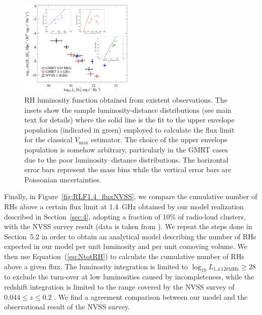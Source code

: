 \documentclass[traditabstract]{aa}
\newcommand{\rmn}{\mathrm}
\begin{document}
\begin{appendix}
\begin{figure}[t]
\centering
\includegraphics[width=0.48\textwidth]{figures/RLF_observations.eps}
\caption{RH luminosity function obtained from existent observations. The insets show the sample luminosity-distance distributions (see main text for details) where the solid line is the fit to the upper envelope population (indicated in green) employed to calculate the flux limit for the classical $V_{\rmn{max}}$ estimator. The choice of the upper envelope population is somehow arbitrary, particularly in the GMRT cases due to the poor luminosity--distance distributions. The horizontal error bars represent the mass bins while the vertical error bars are Poissonian uncertainties.}
\label{fig:RLFobs}
\end{figure}

Finally, in Figure~\ref{fig:RLF1.4_fluxNVSS}, we compare the cumulative number of RHs above a certain flux limit at 1.4~GHz obtained by our model realization described in Section~\ref{sec:4}, adopting a fraction of 10\% of radio-loud clusters, with the NVSS survey result (data is taken from \citealp{2010A&A...509A..68C}). We repeat the steps done in Section~5.2 in order to obtain an analytical model describing the number of RHs expected in our model per unit luminosity and per unit comoving volume. We then use Equation~(\ref{eq:NtotRH}) to calculate the cumulative number of RHs above a given flux. The luminosity integration is limited to $\log_{10} L_{1.4~\rmn{120MHz}} \geq 28$ to exclude the turn-over at low luminosities caused by incompleteness, while the redshift integration is limited to the range covered by the NVSS survey of $0.044 \leq z \leq 0.2$ \citep{1999NewA....4..141G}. We find a agreement comparison between our model and the observational result of the NVSS survey.


\end{appendix}
\end{document}
